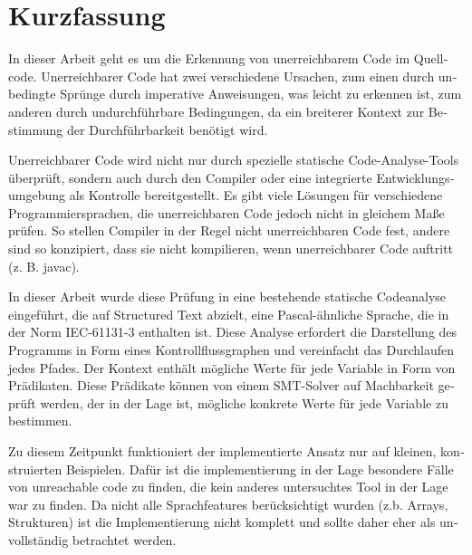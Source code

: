 \chapter{Kurzfassung}

\begin{german}
In dieser Arbeit geht es um die Erkennung von unerreichbarem Code im Quellcode. 
Unerreichbarer Code hat zwei verschiedene Ursachen, zum einen durch unbedingte Sprünge durch imperative Anweisungen, was leicht zu erkennen ist, zum anderen durch undurchführbare Bedingungen, da ein breiterer Kontext zur Bestimmung der Durchführbarkeit benötigt wird.

Unerreichbarer Code wird nicht nur durch spezielle statische Code-Analyse-Tools überprüft, sondern auch durch den Compiler oder eine integrierte Entwicklungsumgebung als Kontrolle bereitgestellt. Es gibt viele Lösungen für verschiedene Programmiersprachen, die unerreichbaren Code jedoch nicht in gleichem Maße prüfen. So stellen Compiler in der Regel nicht unerreichbaren Code fest, andere sind so konzipiert, dass sie nicht kompilieren, wenn unerreichbarer Code auftritt (z. B. javac).


In dieser Arbeit wurde diese Prüfung in eine bestehende statische Codeanalyse eingeführt, die auf Structured Text abzielt, eine Pascal-ähnliche Sprache, die in der Norm IEC-61131-3 enthalten ist. Diese Analyse erfordert die Darstellung des Programms in Form eines Kontrollflussgraphen und vereinfacht das Durchlaufen jedes Pfades. Der Kontext enthält mögliche Werte für jede Variable in Form von Prädikaten. Diese Prädikate können von einem SMT-Solver auf Machbarkeit geprüft werden, der in der Lage ist, mögliche konkrete Werte für jede Variable zu bestimmen. 

Zu diesem Zeitpunkt funktioniert der implementierte Ansatz nur auf kleinen,  konstruierten Beispielen. Dafür ist die implementierung in der Lage besondere Fälle von unreachable code zu finden, die kein anderes untersuchtes Tool in der Lage war zu finden. Da nicht alle Sprachfeatures berücksichtigt wurden (z.b. Arrays, Strukturen) ist die Implementierung nicht komplett und sollte daher eher als unvollständig betrachtet werden.

\end{german}